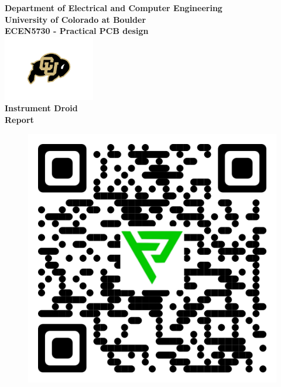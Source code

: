 \begin{titlepage}
\center %

\textbf{\large Department of Electrical and Computer Engineering}\\[0.5cm]
\textbf{\Large University of Colorado at Boulder}\\[1cm]
\textbf{\large ECEN5730 - Practical PCB design}\\[2cm]
\includegraphics[width=0.3\textwidth]{figures/cu}\\[2cm] 

	

\textbf{\Huge Instrument Droid }\\[0.2cm]

\textbf{\Large Report}\\[2cm]
\vspace{1.5cm}
\begin{figure}[H]
	\centering
	\includegraphics[scale=0.2]{figures/qr_download.png}
	\label{555_schematic}
\end{figure}\vspace{1.5cm}



\end{titlepage}
